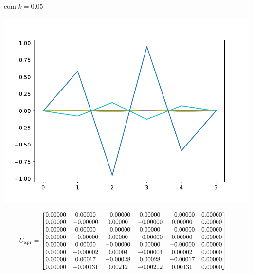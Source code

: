 \documentclass[a4paper, 11pt]{report}
\begin{document}
\begin{enumerate}[leftmargin=*]
        \begin{minipage}{0.35\columnwidth}
            \begin{center}
                com $k = 0.05$
            \end{center}
            \includegraphics[width=\columnwidth]{../edp/12.2_5a2.pdf}
        \end{minipage}
        \begin{minipage}{0.6\columnwidth}
            \begin{align*}
                U_{\text{apr}} &= 
                {\small
                \begin{bmatrix}
                    0.00000 &   0.00000 &  -0.00000 &   0.00000 &  -0.00000 &   0.00000\\  
                    0.00000 &  -0.00000 &   0.00000 &  -0.00000 &   0.00000 &   0.00000\\  
                    0.00000 &   0.00000 &  -0.00000 &   0.00000 &  -0.00000 &   0.00000\\  
                    0.00000 &  -0.00000 &   0.00000 &  -0.00000 &   0.00000 &   0.00000\\  
                    0.00000 &   0.00000 &  -0.00000 &   0.00000 &  -0.00000 &   0.00000\\  
                    0.00000 &  -0.00002 &   0.00004 &  -0.00004 &   0.00002 &   0.00000\\  
                    0.00000 &   0.00017 &  -0.00028 &   0.00028 &  -0.00017 &   0.00000\\  
                    0.00000 &  -0.00131 &   0.00212 &  -0.00212 &   0.00131 &   0.00000\\  

\end{bmatrix}}
\end{align*}
\end{minipage}
\end{enumerate}
\end{document}
